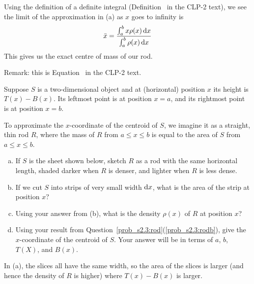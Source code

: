 \begin{solution}
\begin{enumerate}[(a)]
Using the definition of a definite integral (Definition~ in the CLP-2 text), we see the limit of the approximation in (a) as $x$ goes to infinity is
\[\bar x=\frac{\int_a^b x\rho(x)\,\mathrm{d}x}{\int_a^b\rho(x)\,\mathrm{d}x}\]
This gives us the exact centre of mass of our rod.

Remark: this is Equation~ in the CLP-2 text.
\end{enumerate}
\end{solution}
\begin{question}\label{prob_s2.3:xbar}
Suppose  $S$ is a two-dimensional object
and at (horizontal) position $x$  its height is $T(x)-B(x)$. Its leftmost point is at position $x=a$, and its rightmost point is at position $x=b$.

To approximate the $x$-coordinate of the centroid of $S$, we imagine it as a straight, thin rod $R$, where the mass of $R$ from $a \le x \le b$ is equal to the area of $S$ from $a \leq x \leq b$.
\begin{enumerate}[(a)]
\item If $S$ is the sheet shown below, sketch $R$ as a rod with the same horizontal length, shaded darker when $R$ is denser, and lighter when $R$ is less dense.
\begin{center}
\end{center}
\item If we cut $S$ into strips of very small width $\mathrm{d}x$, what is the  area of the strip at position $x$?
\item Using your answer from (b), what is the  density $\rho(x)$ of $R$ at position $x$?
\item Using your result from Question~\ref{prob_s2.3:rod}(\ref{prob_s2.3:rodb}), give the $x$-coordinate of the centroid of $S$. Your answer will be in terms of $a$, $b$, $T(X)$, and $B(x)$.
\end{enumerate}
\end{question}
\begin{hint}
In (a), the slices all have the same width, so the area of the slices is larger (and hence the density of $R$ is higher) where $T(x)-B(x)$ is larger.
\end{hint}
